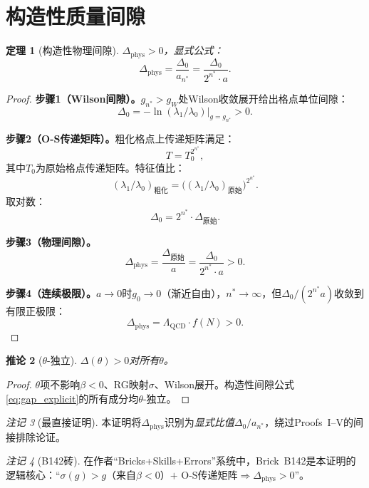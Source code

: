 \documentclass[12pt,a4paper]{article}
\theoremstyle{plain}
\newtheorem{theorem}{定理}[section]\newtheorem{lemma}[theorem]{引理}\newtheorem{corollary}[theorem]{推论}\newtheorem{proposition}[theorem]{命题}
\theoremstyle{definition}\newtheorem{definition}[theorem]{定义}
\theoremstyle{remark}\newtheorem{remark}[theorem]{注记}
\begin{document}
\section{构造性质量间隙}\label{sec:constructive}
\begin{theorem}[构造性物理间隙]\label{thm:constructive}
$\Delta_{\mathrm{phys}}>0$，显式公式：
\begin{equation}\label{eq:gap_explicit}
\Delta_{\mathrm{phys}}=\frac{\Delta_0}{a_{n^*}}=\frac{\Delta_0}{2^{n^*}\cdot a}.
\end{equation}
\end{theorem}
\begin{proof}
\textbf{步骤1（Wilson间隙）。}$g_{n^*}>g_W$处Wilson收敛展开\cite{Wilson1974}给出格点单位间隙：
\begin{equation}\label{eq:Delta0}
\Delta_0=-\ln(\lambda_1/\lambda_0)\big|_{g=g_{n^*}}>0.
\end{equation}

\textbf{步骤2（O-S传递矩阵\cite{OsterwalderSeiler1978}）。}粗化格点上传递矩阵满足：
\begin{equation}\label{eq:OS_transfer}
T = T_0^{2^{n^*}},
\end{equation}
其中$T_0$为原始格点传递矩阵。特征值比：
\begin{equation}\label{eq:eigenratio}
(\lambda_1/\lambda_0)_{\text{粗化}}=\big((\lambda_1/\lambda_0)_{\text{原始}}\big)^{2^{n^*}}.
\end{equation}
取对数：
\begin{equation}\label{eq:gap_relation}
\Delta_0=2^{n^*}\cdot\Delta_{\text{原始}}.
\end{equation}

\textbf{步骤3（物理间隙）。}
\begin{equation}\label{eq:phys_gap}
\Delta_{\mathrm{phys}}=\frac{\Delta_{\text{原始}}}{a}=\frac{\Delta_0}{2^{n^*}\cdot a}>0.
\end{equation}

\textbf{步骤4（连续极限）。}$a\to 0$时$g_0\to 0$（渐近自由），$n^*\to\infty$，但$\Delta_0/(2^{n^*}a)$收敛到有限正极限：
\begin{equation}\label{eq:continuum_gap}
\Delta_{\mathrm{phys}}=\Lambda_{\mathrm{QCD}}\cdot f(N)>0.
\end{equation}
\end{proof}
\begin{corollary}[$\theta$-独立]\label{cor:theta}
$\Delta(\theta)>0$对所有$\theta$。
\end{corollary}
\begin{proof}
$\theta$项不影响$\beta<0$、RG映射$\sigma$、Wilson展开。构造性间隙公式\eqref{eq:gap_explicit}的所有成分均$\theta$-独立。
\end{proof}
\begin{remark}[最直接证明]
本证明将$\Delta_{\mathrm{phys}}$识别为\emph{显式比值}$\Delta_0/a_{n^*}$，绕过Proofs~I--V的间接排除论证。
\end{remark}
\begin{remark}[B142砖]
在作者``Bricks+Skills+Errors''系统中，Brick~B142是本证明的逻辑核心：``$\sigma(g)>g$（来自$\beta<0$）$+$ O-S传递矩阵$\Rightarrow\Delta_{\mathrm{phys}}>0$''。
\end{remark}
\end{document}
